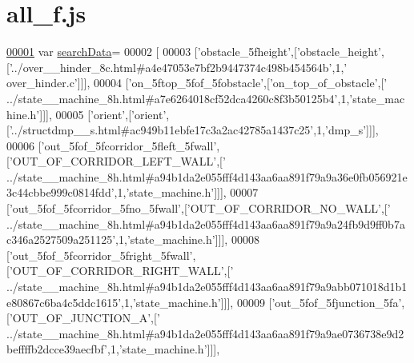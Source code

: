 \hypertarget{all__f_8js_source}{}\section{all\+\_\+f.\+js}
\label{all__f_8js_source}

\begin{DoxyCode}
\hypertarget{all__f_8js_source.tex_l00001}{}\hyperlink{all__f_8js_ad01a7523f103d6242ef9b0451861231e}{00001} var \hyperlink{all__f_8js_ad01a7523f103d6242ef9b0451861231e}{searchData}=
00002 [
00003   [\textcolor{stringliteral}{'obstacle\_5fheight'},[\textcolor{stringliteral}{'obstacle\_height'},[\textcolor{stringliteral}{'../over\_\_hinder\_8c.html#a4e47053e7bf2b9447374c498b454564b'},1,\textcolor{stringliteral}{'
      over\_hinder.c'}]]],
00004   [\textcolor{stringliteral}{'on\_5ftop\_5fof\_5fobstacle'},[\textcolor{stringliteral}{'on\_top\_of\_obstacle'},[\textcolor{stringliteral}{'
      ../state\_\_machine\_8h.html#a7e6264018cf52dca4260c8f3b50125b4'},1,\textcolor{stringliteral}{'state\_machine.h'}]]],
00005   [\textcolor{stringliteral}{'orient'},[\textcolor{stringliteral}{'orient'},[\textcolor{stringliteral}{'../structdmp\_\_s.html#ac949b11ebfe17c3a2ac42785a1437c25'},1,\textcolor{stringliteral}{'dmp\_s'}]]],
00006   [\textcolor{stringliteral}{'out\_5fof\_5fcorridor\_5fleft\_5fwall'},[\textcolor{stringliteral}{'OUT\_OF\_CORRIDOR\_LEFT\_WALL'},[\textcolor{stringliteral}{'
      ../state\_\_machine\_8h.html#a94b1da2e055fff4d143aa6aa891f79a9a36e0fb056921e3c44cbbe999c0814fdd'},1,\textcolor{stringliteral}{'state\_machine.h'}]]],
00007   [\textcolor{stringliteral}{'out\_5fof\_5fcorridor\_5fno\_5fwall'},[\textcolor{stringliteral}{'OUT\_OF\_CORRIDOR\_NO\_WALL'},[\textcolor{stringliteral}{'
      ../state\_\_machine\_8h.html#a94b1da2e055fff4d143aa6aa891f79a9a24fb9d9ff0b7ac346a2527509a251125'},1,\textcolor{stringliteral}{'state\_machine.h'}]]],
00008   [\textcolor{stringliteral}{'out\_5fof\_5fcorridor\_5fright\_5fwall'},[\textcolor{stringliteral}{'OUT\_OF\_CORRIDOR\_RIGHT\_WALL'},[\textcolor{stringliteral}{'
      ../state\_\_machine\_8h.html#a94b1da2e055fff4d143aa6aa891f79a9abb071018d1b1e80867c6ba4c5ddc1615'},1,\textcolor{stringliteral}{'state\_machine.h'}]]],
00009   [\textcolor{stringliteral}{'out\_5fof\_5fjunction\_5fa'},[\textcolor{stringliteral}{'OUT\_OF\_JUNCTION\_A'},[\textcolor{stringliteral}{'
      ../state\_\_machine\_8h.html#a94b1da2e055fff4d143aa6aa891f79a9ae0736738e9d2beffffb2dcce39aecfbf'},1,\textcolor{stringliteral}{'state\_machine.h'}]]],

\end{DoxyCode}
